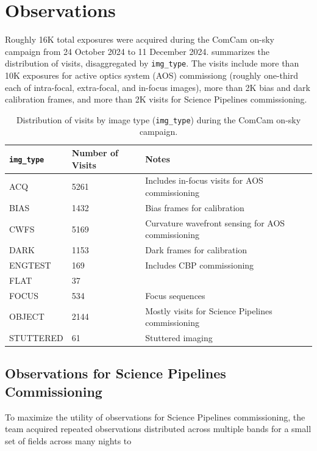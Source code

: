 \section{Observations}
\label{sec:observations}

Roughly 16K total exposures were acquired during the ComCam on-sky campaign from 24 October 2024 to 11 December 2024.
 summarizes the distribution of visits, disaggregated by \texttt{img\_type}.
The visits include more than 10K exposures for active optics system (AOS) commissiong (roughly one-third each of intra-focal, extra-focal, and in-focus images), more than 2K bias and dark calibration frames, and more than 2K visits for Science Pipelines commissioning.

\begin{table}
    \centering
    \begin{tabular}{@{}lll@{}}
    \textbf{\texttt{img\_type}} & \textbf{Number of Visits} & \textbf{Notes} \\
    \hline
    ACQ & 5261 & Includes in-focus visits for AOS commissioning \\
    BIAS & 1432 & Bias frames for calibration \\
    CWFS & 5169 & Curvature wavefront sensing for AOS commissioning \\
    DARK & 1153 & Dark frames for calibration \\
    ENGTEST & 169 & Includes CBP commissioning \\
    FLAT & 37 & \\
    FOCUS & 534 & Focus sequences \\
    OBJECT & 2144 & Mostly visits for Science Pipelines commissioning \\
    STUTTERED & 61 & Stuttered imaging \\
    \end{tabular}
    \caption{Distribution of visits by image type (\texttt{img\_type}) during the ComCam on-sky campaign.}
    \label{tab:img_type}
\end{table}

\subsection{Observations for Science Pipelines Commissioning}

To maximize the utility of observations for Science Pipelines commissioning, the team acquired repeated observations distributed across multiple bands for a small set of fields across many nights to

